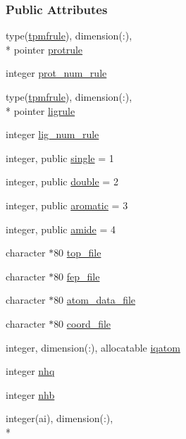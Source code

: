 \subsubsection*{Public Attributes}
\begin{DoxyCompactItemize}
\item 
type(\hyperlink{structcalc__pmf_1_1tpmfrule}{tpmfrule}), dimension(\-:), \\*
pointer \hyperlink{classcalc__pmf_a82f61bada0fda64b2e720d7732f8dadc}{protrule}
\item 
integer \hyperlink{classcalc__pmf_a1986439f8b3e283ee8d21e6b0ca9c5ff}{prot\-\_\-num\-\_\-rule}
\item 
type(\hyperlink{structcalc__pmf_1_1tpmfrule}{tpmfrule}), dimension(\-:), \\*
pointer \hyperlink{classcalc__pmf_a2e7a8f9d268914c54cd26c0fd8b01a81}{ligrule}
\item 
integer \hyperlink{classcalc__pmf_a0159af94a3cd2d849076c0fadc4ac853}{lig\-\_\-num\-\_\-rule}
\item 
integer, public \hyperlink{classcalc__pmf_abe3c333d7711e22367752892c04b6f79}{single} = 1
\item 
integer, public \hyperlink{classcalc__pmf_a4d6e176568c5ef696aa451c5bf70d622}{double} = 2
\item 
integer, public \hyperlink{classcalc__pmf_ac99fa55cb2e0de3acc03adc92db25756}{aromatic} = 3
\item 
integer, public \hyperlink{classcalc__pmf_aa79a18fe363aeaa2831ccf58dd4a7fcc}{amide} = 4
\item 
character $\ast$80 \hyperlink{classcalc__pmf_a5e4abdec940eb0d22b396ceda84d2e99}{top\-\_\-file}
\item 
character $\ast$80 \hyperlink{classcalc__pmf_a9ed164a5cea390709d7eef68e326a1d4}{fep\-\_\-file}
\item 
character $\ast$80 \hyperlink{classcalc__pmf_a934737a3cd94904c0cd91912062ce21f}{atom\-\_\-data\-\_\-file}
\item 
character $\ast$80 \hyperlink{classcalc__pmf_a02daa11aa1b64ff1167a0a99779a1f3c}{coord\-\_\-file}
\item 
integer, dimension(\-:), allocatable \hyperlink{classcalc__pmf_aab09205514afe9e25c1d4750897417a6}{iqatom}
\item 
integer \hyperlink{classcalc__pmf_ab95df575df3eab3d788f4761abf090e5}{nhq}
\item 
integer \hyperlink{classcalc__pmf_aaa971de9116dc55c46845c0e34e09384}{nhb}
\item 
integer(ai), dimension(\-:), \\*

\end{DoxyCompactItemize}
